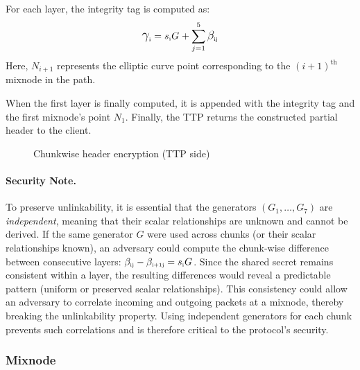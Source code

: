 \noindent
For each layer, the integrity tag is computed as:
\begin{equation}
\C{i} = \sG{i}{} + \sum_{j=1}^{5} \B{i}{j}
\label{eq:integrity}
\end{equation}
Here, $ N_{i+1} $ represents the elliptic curve point corresponding to the $ (i+1)^\text{th} $ mixnode in the path.

When the first layer is finally computed, it is appended with the integrity tag  and the first mixnode’s point $ N_1 $.
Finally, the TTP returns the constructed partial header to the client.

\begin{figure}[H]
    \centering
    \resizebox{0.9\linewidth}{!}{}
    \caption{Chunkwise header encryption (TTP side)}
    \label{fig:chunked_schema}
\end{figure}

\paragraph{\textbf{Security Note.}}\label{note:security_why_indep_generators}
To preserve unlinkability, it is essential that the generators $ (G_1, \dots, G_7) $ are \textit{independent}, meaning that their scalar relationships are unknown and cannot be derived.
If the same generator $ G $ were used across chunks (or their scalar relationships known), an adversary could compute the chunk-wise difference between consecutive layers: $ \B{i}{j} - \B{i+1}{j} = \sG{i}{} $.
Since the shared secret  remains consistent within a layer, the resulting differences would reveal a predictable pattern (uniform or preserved scalar relationships).
This consistency could allow an adversary to correlate incoming and outgoing packets at a mixnode, thereby breaking the unlinkability property.
Using independent generators for each chunk prevents such correlations and is therefore critical to the protocol's security.  


\subsubsection{Mixnode}

